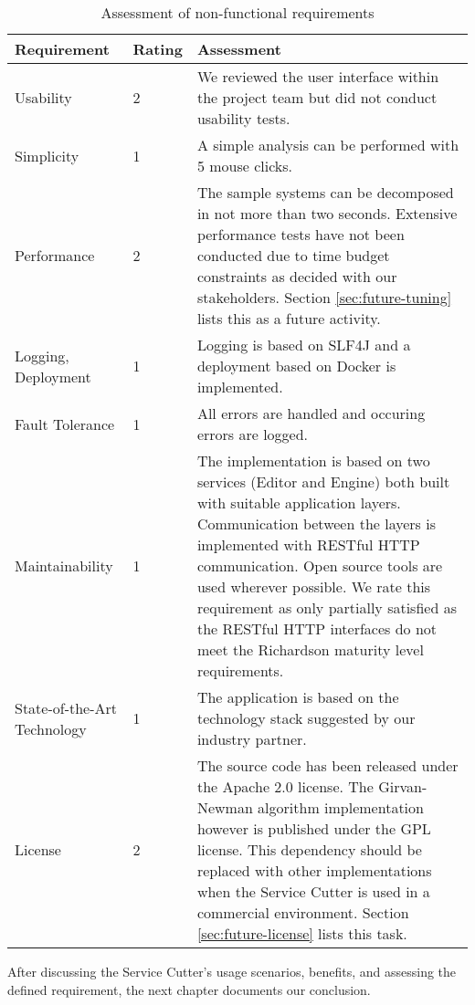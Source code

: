 \begin{table}[H]
	\centering
	\caption{Assessment of non-functional requirements}
	\label{tab:conclusionNonFunctional}
	\begin{tabular}{|p{100pt}|l|p{250pt}|}
	\hline \textbf{Requirement} & \textbf{Rating} & \textbf{Assessment} \\ 
	\hline Usability & 2 & We reviewed the user interface within the project team but did not conduct usability tests. \\
	\hline Simplicity & 1 & A simple analysis can be performed with 5 mouse clicks. \\
	\hline Performance & 2 & The sample systems can be decomposed in not more than two seconds. Extensive performance tests have not been conducted due to time budget constraints as decided with our stakeholders. Section \ref{sec:future-tuning} lists this as a future activity. \\
	\hline Logging, \newline Deployment & 1 & Logging is based on SLF4J and a deployment based on Docker is implemented. \\
	\hline Fault Tolerance & 1 & All errors are handled and occuring errors are logged. \\
	\hline Maintainability & 1 & The implementation is based on two services (Editor and Engine) both built with suitable application layers. Communication between the layers is implemented with RESTful HTTP communication. Open source tools are used wherever possible. We rate this requirement as only partially satisfied as the RESTful HTTP interfaces do not meet the Richardson maturity level requirements.  \\
	\hline State-of-the-Art Technology & 1 & The application is based on the technology stack suggested by our industry partner. \\
	\hline License & 2 & The source code has been released under the Apache 2.0 license. The Girvan-Newman algorithm implementation however is published under the GPL license. This dependency should be replaced with other implementations when the Service Cutter is used in a commercial environment. Section \ref{sec:future-license} lists this task. \\
	\hline 
	\end{tabular} 
\end{table}

After discussing the Service Cutter's usage scenarios, benefits, and assessing the defined requirement, the next chapter documents our conclusion.

